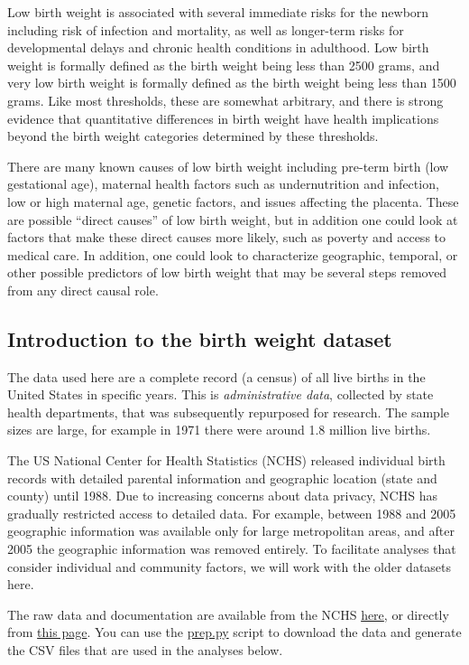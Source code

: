 Low birth weight is associated with several immediate risks for the newborn including risk of infection and mortality, as well as longer-term risks for developmental delays and chronic health conditions in adulthood. Low birth weight is formally defined as the birth weight being less than 2500 grams, and very low birth weight is formally defined as the birth weight being less than 1500 grams.  Like most thresholds, these are somewhat arbitrary, and there is strong evidence that quantitative differences in birth weight have health implications beyond the birth weight categories determined by these thresholds.

There are many known causes of low birth weight including pre-term birth (low gestational age), maternal health factors such as undernutrition and infection, low or high maternal age, genetic factors, and issues affecting the placenta.  These are possible ``direct causes'' of low birth weight, but in addition one could look at factors that make these direct causes more likely, such as poverty and access to medical care.  In addition, one could look to characterize geographic, temporal, or other possible predictors of low birth weight that may be several steps removed from any direct causal role.

\subsection{Introduction to the birth weight dataset}

The data used here are a complete record (a census) of all live births in the United States in specific years.  This is {\em administrative data}, collected by state health departments, that was subsequently repurposed for research.  The sample sizes are large, for example in 1971 there were around 1.8 million live births.

The US National Center for Health Statistics (NCHS) released individual birth records with detailed parental information and geographic location (state and county) until 1988.  Due to increasing concerns about data privacy, NCHS has gradually restricted access to detailed data.  For example, between 1988 and 2005 geographic information was available only for large metropolitan areas, and after 2005 the geographic information was removed entirely.  To facilitate analyses that consider individual and community factors, we will work with the older datasets here.

The raw data and documentation are available from the NCHS \href{https://www.cdc.gov/nchs/data_access/vitalstatsonline.htm}{here}, or directly from \href{https://ftp.cdc.gov/pub/Health_Statistics/NCHS/Datasets/DVS/natality}{this page}.  You can use the \href{https://github.com/kshedden/case_studies/blob/main/birthweight/prep.py}{prep.py} script to download the data and generate the CSV files that are used in the analyses below.

